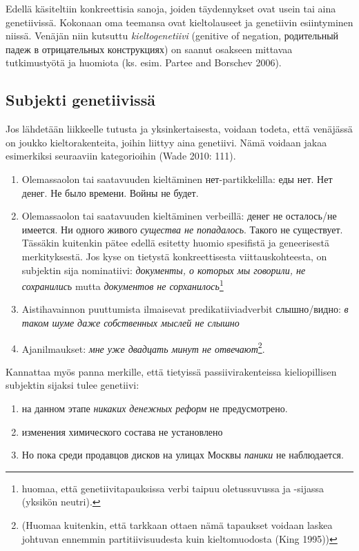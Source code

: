 \documentclass[]{scrreprt}
\providecommand{\tightlist}{%
  \setlength{\itemsep}{0pt}\setlength{\parskip}{0pt}}
\begin{document}
Edellä käsiteltiin konkreettisia sanoja, joiden täydennykset ovat usein
tai aina genetiivissä. Kokonaan oma teemansa ovat kieltolauseet ja
genetiivin esiintyminen niissä. Venäjän niin kutsuttu
\emph{kieltogenetiivi} (genitive of negation, родительный падеж в
отрицательных конструкциях) on saanut osakseen mittavaa tutkimustyötä ja
huomiota (ks. esim. Partee and Borschev 2006).

\subsection{Subjekti genetiivissä}\label{subjekti-genetiivissuxe4}

Jos lähdetään liikkeelle tutusta ja yksinkertaisesta, voidaan todeta,
että venäjässä on joukko kieltorakenteita, joihin liittyy aina
genetiivi. Nämä voidaan jakaa esimerkiksi seuraaviin kategorioihin (Wade
2010: 111).

\begin{enumerate}
\def\labelenumi{\arabic{enumi}.}
\tightlist
\item
  Olemassaolon tai saatavuuden kieltäminen нет-partikkelilla: еды нет.
  Нет денег. Не было времени. Войны не будет.
\item
  Olemassaolon tai saatavuuden kieltäminen verbeillä: денег не
  осталось/не имеется. Ни одного живого \emph{существа не попадалось}.
  Такого не существует. Tässäkin kuitenkin pätee edellä esitetty huomio
  spesifistä ja geneerisestä merkityksestä. Jos kyse on tietystä
  konkreettisesta viittauskohteesta, on subjektin sija nominatiivi:
  \emph{документы, о которых мы говорили, не сохранились} mutta
  \emph{документов не сорханилось}\footnote{huomaa, että
    genetiivitapauksissa verbi taipuu oletussuvussa ja -sijassa (yksikön
    neutri).}
\item
  Aistihavainnon puuttumista ilmaisevat predikatiiviadverbit
  слышно/видно: \emph{в таком шуме даже собственных мыслей не слышно}
\item
  Ajanilmaukset: \emph{мне уже двадцать минут не отвечают}\footnote{(Huomaa
    kuitenkin, että tarkkaan ottaen nämä tapaukset voidaan laskea
    johtuvan ennemmin partitiivisuudesta kuin kieltomuodosta (King
    1995))}.
\end{enumerate}

Kannattaa myös panna merkille, että tietyissä passiivirakenteissa
kieliopillisen subjektin sijaksi tulee genetiivi:

\begin{enumerate}
\def\labelenumi{(\arabic{enumi})}
\setcounter{enumi}{59}
\tightlist
\item
  на данном этапе \emph{никаких денежных реформ} не предусмотрено.
\item
  изменения химического состава не установлено
\item
  Но пока среди продавцов дисков на улицах Москвы \emph{паники} не
  наблюдается.
\end{enumerate}
\end{document}

